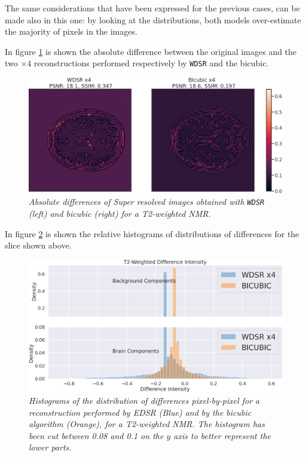 \documentclass[12pt,a4paper]{report}
\begin{document}
The same considerations that have been expressed for the previous cases, can be made also in this one: by looking at the distributions, both models over-estimate the majority of pixels in the images. 

In figure \ref{fig:wdsr-diff-t2} is shown the absolute difference between the original images and the two $\times 4$ reconstructions performed respectively by {\tt WDSR} and the bicubic.

\begin{figure}[H]
 \centering
 \includegraphics[scale=0.4]{./images/WDSR_diff_t2.png}
 \caption{\it Absolute differences of Super resolved images obtained with {\tt WDSR} (left) and bicubic (right) for a T2-weighted NMR.}
 \label{fig:wdsr-diff-t2}
\end{figure}

In figure \ref{fig:wdsr-diff-histo-t2} is shown the relative histograms of distributions of differences for the slice shown above.

\begin{figure}[H]
 \centering
 \includegraphics[scale=0.3]{./images/WDSR_diff_histo_t2.png}
 \caption{\it Histograms of the distribution of differences pixel-by-pixel for a reconstruction performed by EDSR (Blue) and by the bicubic algorithm (Orange), for a T2-weighted NMR. The histogram has been cut between 0.08 and 0.1 on the $y$ axis to better represent the lower parts.}
 \label{fig:wdsr-diff-histo-t2}
\end{figure}
\end{document}
